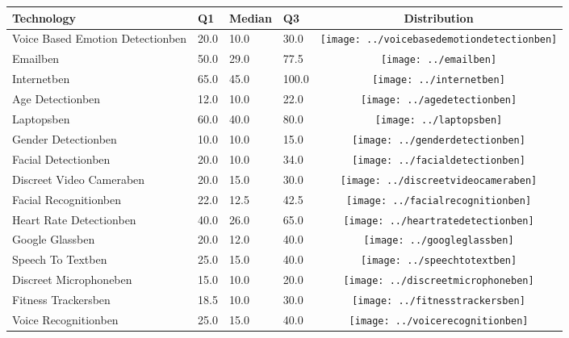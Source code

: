 \begin{table}[t]
\begin{center}
\small
\begin{tabular}{| p{2cm} | p{1cm} | p{1cm} | p{1cm} | c |}
\hline
Technology & Q1 &  Median & Q3 & Distribution  \\ 
\hline
Voice Based Emotion Detectionben & 20.0 & 10.0 & 30.0 & \texttt{[image: ../voicebasedemotiondetectionben]} \\ 
Emailben & 50.0 & 29.0 & 77.5 & \texttt{[image: ../emailben]} \\ 
Internetben & 65.0 & 45.0 & 100.0 & \texttt{[image: ../internetben]} \\ 
Age Detectionben & 12.0 & 10.0 & 22.0 & \texttt{[image: ../agedetectionben]} \\ 
Laptopsben & 60.0 & 40.0 & 80.0 & \texttt{[image: ../laptopsben]} \\ 
Gender Detectionben & 10.0 & 10.0 & 15.0 & \texttt{[image: ../genderdetectionben]} \\ 
Facial Detectionben & 20.0 & 10.0 & 34.0 & \texttt{[image: ../facialdetectionben]} \\ 
Discreet Video Cameraben & 20.0 & 15.0 & 30.0 & \texttt{[image: ../discreetvideocameraben]} \\ 
Facial Recognitionben & 22.0 & 12.5 & 42.5 & \texttt{[image: ../facialrecognitionben]} \\ 
Heart Rate Detectionben & 40.0 & 26.0 & 65.0 & \texttt{[image: ../heartratedetectionben]} \\ 
Google Glassben & 20.0 & 12.0 & 40.0 & \texttt{[image: ../googleglassben]} \\ 
Speech To Textben & 25.0 & 15.0 & 40.0 & \texttt{[image: ../speechtotextben]} \\ 
Discreet Microphoneben & 15.0 & 10.0 & 20.0 & \texttt{[image: ../discreetmicrophoneben]} \\ 
Fitness Trackersben & 18.5 & 10.0 & 30.0 & \texttt{[image: ../fitnesstrackersben]} \\ 
Voice Recognitionben & 25.0 & 15.0 & 40.0 & \texttt{[image: ../voicerecognitionben]} \\ 

\end{tabular}
\end{center}
\end{table}
